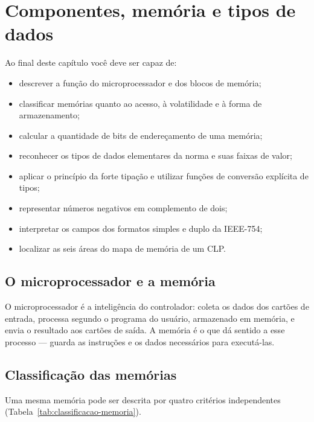 \chapter{Componentes, memória e tipos de dados}
\label{cap:memoria}

\begin{objetivos}
Ao final deste capítulo você deve ser capaz de:
\begin{itemize}
  \item descrever a função do microprocessador e dos blocos de memória;
  \item classificar memórias quanto ao acesso, à volatilidade e à forma de armazenamento;
  \item calcular a quantidade de bits de endereçamento de uma memória;
  \item reconhecer os tipos de dados elementares da norma e suas faixas de valor;
  \item aplicar o princípio da forte tipação e utilizar funções de conversão explícita de tipos;
  \item representar números negativos em complemento de dois;
  \item interpretar os campos dos formatos simples e duplo da IEEE-754;
  \item localizar as seis áreas do mapa de memória de um CLP.
\end{itemize}
\end{objetivos}

\section{O microprocessador e a memória}

O microprocessador é a inteligência do controlador: coleta os dados dos cartões de entrada, processa
segundo o programa do usuário, armazenado em memória, e envia o resultado aos cartões de saída.
A memória é o que dá sentido a esse processo --- guarda as instruções e os dados necessários para
executá-las.


\section{Classificação das memórias}

Uma mesma memória pode ser descrita por quatro critérios independentes
(Tabela~\ref{tab:classificacao-memoria}).

